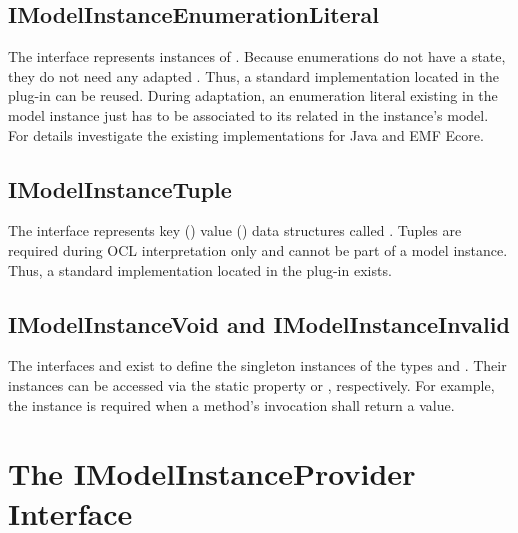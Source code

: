 \subsection{IModelInstanceEnumerationLiteral}

The interface  represents instances of . Because enumerations do not have a state, they do not need any adapted . Thus, a standard  implementation located in the plug-in  can be reused. During adaptation, an enumeration literal existing in the model instance just has to be associated to its related  in the instance's model. For details investigate the existing  implementations for Java and \acs{EMF} Ecore.


\subsection{IModelInstanceTuple}

The interface  represents key () value () data structures called . Tuples are required during \acs{OCL} interpretation only and cannot be part of a model instance. Thus, a standard  implementation located in the plug-in  exists.


\subsection{IModelInstanceVoid and IModelInstanceInvalid}

The interfaces  and  exist to define the singleton instances of the types  and . Their instances can be accessed via the static property  or , respectively. For example, the  instance is required when a method's invocation shall return a  value.



\section{The IModelInstanceProvider Interface}

